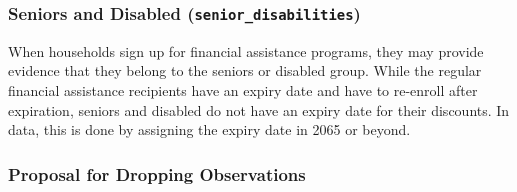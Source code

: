 \documentclass[11pt]{article}
\begin{document}
\subsubsection*{Seniors and Disabled (\texttt{senior\_disabilities})}

When households sign up for financial assistance programs, they may provide evidence that they belong to the seniors or disabled group. While the regular financial assistance recipients have an expiry date and have to re-enroll after expiration, seniors and disabled do not have an expiry date for their discounts. In data, this is done by assigning the expiry date in 2065 or beyond.

\subsubsection*{Proposal for Dropping Observations}
\end{document}
